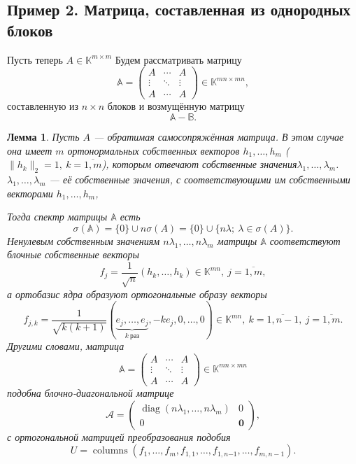 \documentclass[12pt]{article}
\newtheorem{ksvlem}[ksvthm]{Лемма}
\theoremstyle{definition}
\begin{document}
\subsection*{Пример 2. Матрица, составленная из однородных блоков}
Пусть теперь \( A\in \mathbb{K}^{m\times m} \)
Будем рассматривать матрицу
\[
    \mathbb{A} =
    \begin{pmatrix}
        A      & \cdots & A \\
        \vdots & \ddots & \vdots \\
        A      & \cdots & A
    \end{pmatrix}
    \in \mathbb{K}^{mn{\times}mn},
    \]
    составленную из \( n\times n \) блоков
    и возмущённую матрицу
\[
    \mathbb{A} - \mathbb{B}.
    \]

\begin{ksvlem}
    Пусть \( A \) --- обратимая самосопряжённая матрица.
    В этом случае она имеет \( m \) ортонормальных
    собственных векторов \( h_1, \ldots, h_m \)
    (\( \|h_k\|_2=1,\ k{=}\overline{1,m} \)),
    которым отвечают собственные значения\( \lambda_1, \ldots, \lambda_m \).
    \( \lambda_1, \ldots, \lambda_m \)
    --- её собственные значения,
    с соответствующими им собственными векторами
    \( h_1, \ldots, h_m \),

    Тогда спектр матрицы \( \mathbb{A} \) есть
    \[
        \sigma(\mathbb{A}) = \{0\} \cup n\sigma(A)
        = \{ 0 \} \cup \{ n\lambda;\ \lambda\in\sigma(A) \}.
        \]
    Ненулевым собственным значениям \( n\lambda_1, \ldots, n\lambda_m \)
    матрицы \( \mathbb{A} \)
    соответствуют блочные собственные векторы
    \[
        f_j = \frac{1}{\sqrt{n}}(h_k, \ldots, h_k)\in\mathbb{K}^{mn},
        \ j{=}\overline{1,m},
       \]
    а ортобазис ядра образуют ортогональные образу
    векторы
    \[
        f_{j,k} =
        \frac{1}{\sqrt{k(k+1)}}
        (\underbrace{e_j,\ldots,e_j}_{k\ \text{раз}}, -ke_j, 0, \ldots, 0)\in\mathbb{K}^{mn},
        \ k{=}\overline{1,n-1},
        \ j{=}\overline{1,m}.
        \]
    Другими словами, матрица
    \[
        \mathbb{A} =
        \begin{pmatrix}
            A      & \cdots & A \\
            \vdots & \ddots & \vdots \\
            A      & \cdots & A
        \end{pmatrix}
        \in\mathbb{K}^{mn{\times}mn}
        \]
    подобна блочно-диагональной матрице
    \[
        \mathcal{A} =
        \left(\begin{array}{c|c}
            \operatorname{diag}(n\lambda_1,\ldots,n\lambda_m) & 0 \\ \hline
            0 & \mathbf{0}
        \end{array}\right),
        \]
    с ортогональной матрицей преобразования подобия
    \[
        U = \operatorname{columns}
        \left(f_1, \ldots, f_m, f_{1,1}, \ldots, f_{1,n{-1}}, \ldots, f_{m,n{-}1}\right).
        \]
\end{ksvlem}
\end{document}
